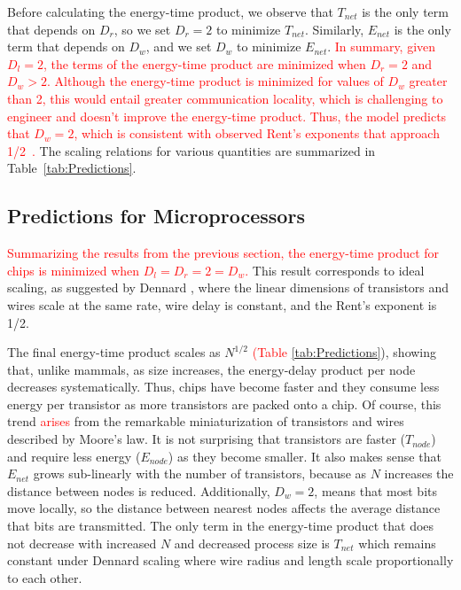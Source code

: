 \documentclass[12pt]{article}
\newcommand{\red}[1]{\textcolor{red}{#1}}
\begin{document}
Before calculating the energy-time product, we observe that $T_{net}$ is the
only term that depends on $D_r$, so we set  $D_r = 2$ to minimize
$T_{net}$. Similarly, $E_{net}$ is the only term that depends on  $D_w$, and we
set $D_w$ to minimize $E_{net}$. \red{In summary, given $D_l = 2$, the terms of the energy-time product are minimized
when $D_r = 2$ and $D_w > 2$. Although
the energy-time product is minimized for values of $D_w$ greater than 2,
this would entail greater communication locality, which is challenging
to engineer and doesn't improve
the energy-time product.  Thus, the model predicts 
that $D_w = 2$, which is consistent with observed
Rent's exponents that approach 1/2~\cite{yang2001wirelength, solee2013evolutionary}.}  The scaling relations for various
quantities are summarized in Table~\ref{tab:Predictions}.

\subsection{Predictions for Microprocessors}
\label{sec:comp-predictions}

\red{Summarizing the results from the previous section, the energy-time
product for chips is minimized when 
$D_l=D_r =2 =D_w$.}
This result corresponds to ideal scaling, as suggested by Dennard
\cite{dennard74}, where the linear dimensions of transistors and wires scale at
the same rate, wire delay is constant, and the Rent's exponent is 1/2.  

The final energy-time product scales as $N^{1/2}$ \red{(Table \ref{tab:Predictions}}), showing that, unlike
mammals, as size increases, the energy-delay product per node decreases
systematically.  Thus, chips have become faster and they consume less energy per
transistor as more transistors are packed onto a chip. Of course, this
trend \red{arises}
from the remarkable miniaturization of transistors and wires described by
Moore's law. It is not surprising that transistors are faster ($T_{node}$) and
require less energy ($E_{node}$) as they become smaller. It also makes sense
that  $E_{net}$ grows sub-linearly with the number of transistors, because as
$N$ increases the distance between nodes is reduced. Additionally, $D_w = 2$,
means that most bits move locally, so the distance between nearest nodes
affects the average distance that bits are transmitted.  The only term in the
energy-time product that does not decrease with increased $N$ and decreased
process size is $T_{net}$ which remains constant under Dennard scaling where
wire radius and length scale proportionally to each other.
\end{document}
